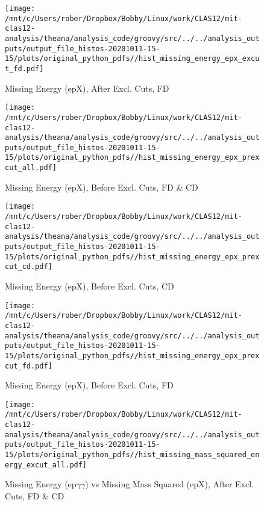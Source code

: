 \documentclass{article}
\begin{document}
\begin{landscape}
\begin{figure}[h]
        \texttt{[image: /mnt/c/Users/rober/Dropbox/Bobby/Linux/work/CLAS12/mit-clas12-analysis/theana/analysis\_code/groovy/src/../../analysis\_outputs/output\_file\_histos-20201011-15-15/plots/original\_python\_pdfs//hist\_missing\_energy\_epx\_excut\_fd.pdf]}
        \captionsetup{textformat=empty,labelformat=blank}
        \caption{Missing Energy (epX), After Excl. Cuts, FD}
    \end{figure}
    \clearpage
    
    \begin{figure}[h]
        \centering

        \texttt{[image: /mnt/c/Users/rober/Dropbox/Bobby/Linux/work/CLAS12/mit-clas12-analysis/theana/analysis\_code/groovy/src/../../analysis\_outputs/output\_file\_histos-20201011-15-15/plots/original\_python\_pdfs//hist\_missing\_energy\_epx\_prexcut\_all.pdf]}
        \captionsetup{textformat=empty,labelformat=blank}
        \caption{Missing Energy (epX), Before Excl. Cuts, FD \& CD}
    \end{figure}
    \clearpage
    
    \begin{figure}[h]
        \centering

        \texttt{[image: /mnt/c/Users/rober/Dropbox/Bobby/Linux/work/CLAS12/mit-clas12-analysis/theana/analysis\_code/groovy/src/../../analysis\_outputs/output\_file\_histos-20201011-15-15/plots/original\_python\_pdfs//hist\_missing\_energy\_epx\_prexcut\_cd.pdf]}
        \captionsetup{textformat=empty,labelformat=blank}
        \caption{Missing Energy (epX), Before Excl. Cuts, CD}
    \end{figure}
    \clearpage
    
    \begin{figure}[h]
        \centering

        \texttt{[image: /mnt/c/Users/rober/Dropbox/Bobby/Linux/work/CLAS12/mit-clas12-analysis/theana/analysis\_code/groovy/src/../../analysis\_outputs/output\_file\_histos-20201011-15-15/plots/original\_python\_pdfs//hist\_missing\_energy\_epx\_prexcut\_fd.pdf]}
        \captionsetup{textformat=empty,labelformat=blank}
        \caption{Missing Energy (epX), Before Excl. Cuts, FD}
    \end{figure}
    \clearpage
    
    \begin{figure}[h]
        \centering

        \texttt{[image: /mnt/c/Users/rober/Dropbox/Bobby/Linux/work/CLAS12/mit-clas12-analysis/theana/analysis\_code/groovy/src/../../analysis\_outputs/output\_file\_histos-20201011-15-15/plots/original\_python\_pdfs//hist\_missing\_mass\_squared\_energy\_excut\_all.pdf]}
        \captionsetup{textformat=empty,labelformat=blank}
        \caption{Missing Energy (ep$\gamma$$\gamma$) vs Missing Mass Squared (epX), After Excl. Cuts, FD \& CD}
    \end{figure}
    \clearpage
    

\end{landscape}
\end{document}
